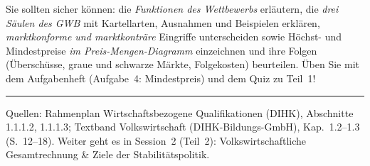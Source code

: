 \documentclass[11pt, a4paper]{article}
\begin{document}
\begin{merksatz}[title={\bfseries Wichtig für die Prüfungsvorbereitung (Teil 1)}]
Sie sollten sicher können: die \emph{Funktionen des Wettbewerbs} erläutern, die
\emph{drei Säulen des GWB} mit Kartellarten, Ausnahmen und Beispielen erklären,
\emph{marktkonforme und marktkonträre} Eingriffe unterscheiden sowie Höchst- und
Mindestpreise \emph{im Preis-Mengen-Diagramm} einzeichnen und ihre Folgen
(Überschüsse, graue und schwarze Märkte, Folgekosten) beurteilen. Üben Sie mit dem
Aufgabenheft (Aufgabe~4: Mindestpreis) und dem Quiz zu Teil~1!
\end{merksatz}

\vspace{1em}
\hrule
\vspace{0.8em}
\noindent\textsf{\small Quellen: Rahmenplan Wirtschaftsbezogene Qualifikationen (DIHK), Abschnitte 1.1.1.2, 1.1.1.3;
Textband Volkswirtschaft (DIHK-Bildungs-GmbH), Kap.~1.2--1.3 (S.~12--18).
Weiter geht es in Session~2 (Teil~2): Volkswirtschaftliche Gesamtrechnung \& Ziele der Stabilitätspolitik.}
\end{document}
